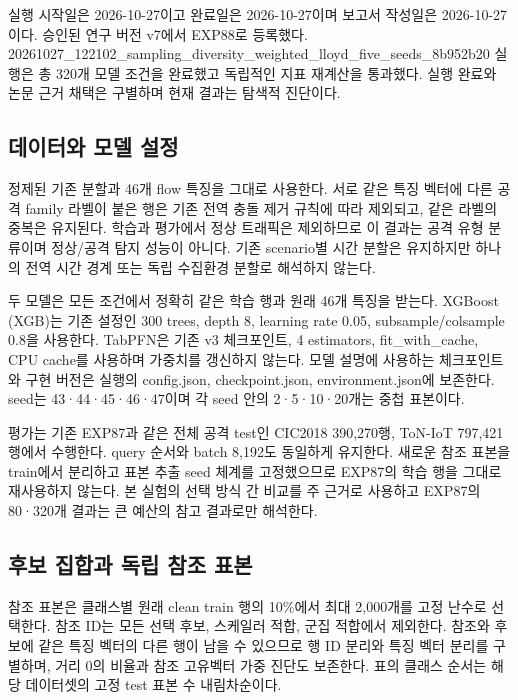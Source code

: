 실행 시작일은 2026-10-27이고 완료일은 2026-10-27이며 보고서 작성일은 2026-10-27이다. 승인된 연구 버전 v7에서 EXP88로 등록했다. 20261027\_\allowbreak{}122102\_\allowbreak{}sampling\_\allowbreak{}diversity\_\allowbreak{}weighted\_\allowbreak{}lloyd\_\allowbreak{}five\_\allowbreak{}seeds\_\allowbreak{}8b952b20 실행은 총 320개 모델 조건을 완료했고 독립적인 지표 재계산을 통과했다. 실행 완료와 논문 근거 채택은 구별하며 현재 결과는 탐색적 진단이다.

\subsection{데이터와 모델 설정}
정제된 기존 분할과 46개 flow 특징을 그대로 사용한다. 서로 같은 특징 벡터에 다른 공격 family 라벨이 붙은 행은 기존 전역 충돌 제거 규칙에 따라 제외되고, 같은 라벨의 중복은 유지된다. 학습과 평가에서 정상 트래픽은 제외하므로 이 결과는 공격 유형 분류이며 정상/\allowbreak{}공격 탐지 성능이 아니다. 기존 scenario별 시간 분할은 유지하지만 하나의 전역 시간 경계 또는 독립 수집환경 분할로 해석하지 않는다.

두 모델은 모든 조건에서 정확히 같은 학습 행과 원래 46개 특징을 받는다. XGBoost (XGB)는 기존 설정인 300 trees, depth 8, learning rate 0.05, subsample/\allowbreak{}colsample 0.8을 사용한다. TabPFN은 기존 v3 체크포인트, 4 estimators, fit\_\allowbreak{}with\_\allowbreak{}cache, CPU cache를 사용하며 가중치를 갱신하지 않는다. 모델 설명에 사용하는 체크포인트와 구현 버전은 실행의 config.json, checkpoint.json, environment.json에 보존한다. seed는 43·44·45·46·47이며 각 seed 안의 2·5·10·20개는 중첩 표본이다.

평가는 기존 EXP87과 같은 전체 공격 test인 CIC2018 390,270행, ToN-IoT 797,421행에서 수행한다. query 순서와 batch 8,192도 동일하게 유지한다. 새로운 참조 표본을 train에서 분리하고 표본 추출 seed 체계를 고정했으므로 EXP87의 학습 행을 그대로 재사용하지 않는다. 본 실험의 선택 방식 간 비교를 주 근거로 사용하고 EXP87의 80·320개 결과는 큰 예산의 참고 결과로만 해석한다.

\subsection{후보 집합과 독립 참조 표본}
참조 표본은 클래스별 원래 clean train 행의 10\%에서 최대 2,000개를 고정 난수로 선택한다. 참조 ID는 모든 선택 후보, 스케일러 적합, 군집 적합에서 제외한다. 참조와 후보에 같은 특징 벡터의 다른 행이 남을 수 있으므로 행 ID 분리와 특징 벡터 분리를 구별하며, 거리 0의 비율과 참조 고유벡터 가중 진단도 보존한다. 표의 클래스 순서는 해당 데이터셋의 고정 test 표본 수 내림차순이다.

